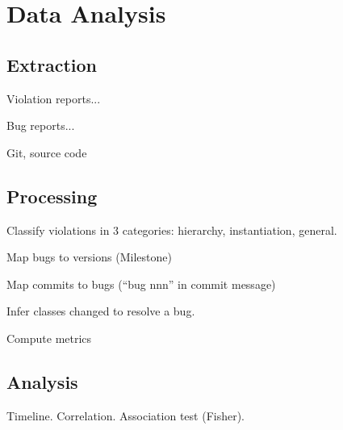 \section{Data Analysis}

\subsection{Extraction}

Violation reports...

Bug reports...

Git, source code

\subsection{Processing}

Classify violations in 3 categories: hierarchy, instantiation, general.

Map bugs to versions (Milestone)

Map commits to bugs (``bug nnn'' in commit message)

Infer classes changed to resolve a bug.

Compute metrics

\subsection{Analysis}

Timeline. Correlation. Association test (Fisher).